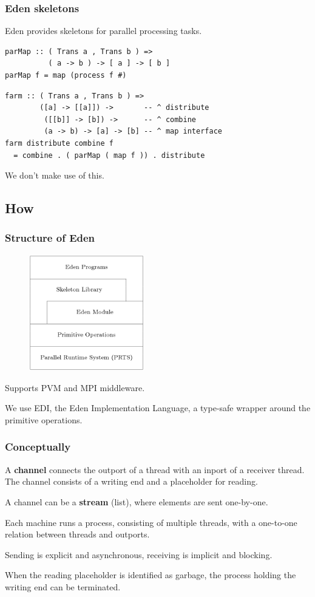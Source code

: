 \documentclass[12pt, danish]{beamer}
\begin{document}
\begin{frame}[fragile]
\frametitle{Eden skeletons}

Eden provides skeletons for parallel processing tasks.

\begin{verbatim}
parMap :: ( Trans a , Trans b ) =>
          ( a -> b ) -> [ a ] -> [ b ]
parMap f = map (process f #)
\end{verbatim}
\pause
\begin{verbatim}
farm :: ( Trans a , Trans b ) =>
        ([a] -> [[a]]) ->       -- ^ distribute
         ([[b]] -> [b]) ->      -- ^ combine
         (a -> b) -> [a] -> [b] -- ^ map interface
farm distribute combine f
  = combine . ( parMap ( map f )) . distribute
\end{verbatim}
\pause
We don't make use of this.
\end{frame}

\subsection{How}

\begin{frame}
\frametitle{Structure of Eden}

\begin{figure}
\includegraphics[width=5cm]{edenstructure.png}
\end{figure}

Supports PVM and MPI middleware.

We use EDI, the Eden Implementation Language, a type-safe wrapper
around the primitive operations.
\end{frame}

\begin{frame}
\frametitle{Conceptually}

A \textbf{channel} connects the outport of a thread with an inport of
a receiver thread.  The channel consists of a writing end and a
placeholder for reading.

\pause

A channel can be a \textbf{stream} (list), where elements are sent
one-by-one.

\pause

Each machine runs a process, consisting of multiple threads, with a
one-to-one relation between threads and outports.

\pause

Sending is explicit and asynchronous, receiving is implicit and
blocking.

\pause

When the reading placeholder is identified as garbage, the process
holding the writing end can be terminated.
\end{frame}
\end{document}
